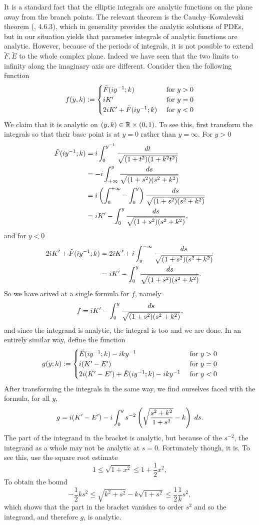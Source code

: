 It is a standard fact that the elliptic integrals are analytic functions on the plane away from the branch points. The relevant theorem is the Cauchy–Kowalevski theorem (\cite{Evans1998}, 4.6.3), which in generality provides the analytic solutions of PDEs, but in our situation yields that parameter integrals of analytic functions are analytic. However, because of the periods of integrals, it is not possible to extend $\tilde F, \tilde E$ to the whole complex plane. Indeed we have seen that the two limits to infinity along the imaginary axis are different. Consider then the following function
\[
f(y, k) :=
\begin{cases}
\tilde F(i y^{-1}; k)             & \text{ for } y > 0 \\
i K'                              & \text{ for } y = 0 \\
2i K' + \tilde F(i y^{-1}; k)   & \text{ for } y < 0
\end{cases}
\]
We claim that it is analytic on $(y,k) \in \mathbb{R}\times (0,1)$. To see this, first transform the integrals so that their base point is at $y=0$ rather than $y=\infty$. For $y>0$
\begin{align}
\tilde F(i y^{-1}; k)
&= i \int_0^{y^{-1}} \frac{dt}{\sqrt{(1+t^2)(1+k^2t^2)}} \\
&= -i \int_{+\infty}^{y} \frac{ds}{\sqrt{(1+s^2)(s^2+k^2)}} \\
&= i \left(\int_0^{+\infty} - \int_0^y \right) \frac{ds}{\sqrt{(1+s^2)(s^2+k^2)}} \\
&= i K' - \int_0^y \frac{ds}{\sqrt{(1+s^2)(s^2+k^2)}},
\end{align}
and for $y < 0$
\begin{align}
2i K' + \tilde F(i y^{-1}; k)
&= 2i K' + i \int_y^{-\infty} \frac{ds}{\sqrt{(1+s^2)(s^2+k^2)}} \\
&= i K' - \int_0^y \frac{ds}{\sqrt{(1+s^2)(s^2+k^2)}}.
\end{align}
So we have arived at a single formula for $f$, namely
\[
f = i K' - \int_0^y \frac{ds}{\sqrt{(1+s^2)(s^2+k^2)}},
\]
and since the integrand is analytic, the integral is too and we are done. In an entirely similar way, define the function
\[
g(y;k) :=
\begin{cases}
\tilde E(i y^{-1}; k) - i ky^{-1}             & \text{ for } y > 0 \\
i (K'-E')                                       & \text{ for } y = 0 \\
2i (K'-E') + \tilde E(i y^{-1}; k)  - i ky^{-1}  & \text{ for } y < 0
\end{cases}
\]
After transforming the integrals in the same way, we find ourselves faced with the formula, for all $y$,
\[
g = i (K'-E') - i \int_0^y s^{-2}\left( \sqrt{\frac{s^2 + k^2}{1 + s^2}} - k \right)\;ds.
\]
The part of the integrand in the bracket is analytic, but because of the $s^{-2}$, the integrand as a whole may not be analytic at $s=0$. Fortunately though, it is. To see this, use the square root estimate
\[
1 \leq \sqrt {1 + x^2} \leq 1 + \frac{1}{2}x^2,
\]
To obtain the bound
\[
-\frac{1}{2}k s^2 \leq \sqrt{k^2 + s^2} - k \sqrt{1+s^2} \leq \frac{1}{2}\frac{1}{k} s^2,
\]
which shows that the part in the bracket vanishes to order $s^2$ and so the integrand, and therefore $g$, is analytic.

